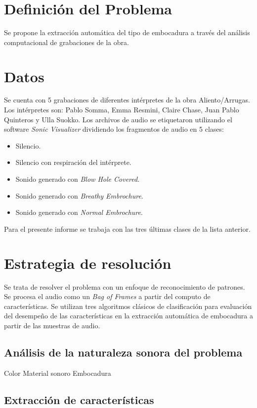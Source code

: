 \documentclass{article}
\begin{document}
\section*{Definición del Problema}
Se propone la extracción automática del tipo de embocadura a través del análisis computacional de grabaciones de la obra. 

\section*{Datos}
Se cuenta con 5 grabaciones de diferentes intérpretes de la obra Aliento/Arrugas. Los intérpretes son: Pablo Somma, Emma Resmini, Claire Chase, Juan Pablo Quinteros y Ulla Suokko. Los archivos de audio se etiquetaron utilizando el software \textit{Sonic Visualizer} dividiendo los fragmentos de audio en 5 clases:

\begin{itemize} 
  \item Silencio.
  \item Silencio con respiración del intérprete. 
  \item Sonido generado con \textit{Blow Hole Covered}.
  \item Sonido generado con \textit{Breathy Embrochure}.
  \item Sonido generado con \textit{Normal Embrochure}.
\end{itemize}

Para el presente informe se trabaja con las tres últimas clases de la lista anterior. 

\section{Estrategia de resolución}

Se trata de resolver el problema con un enfoque de reconocimiento de patrones. Se procesa el audio como un \textit{Bag of Frames} a partir del computo de características. Se utilizan tres algoritmos clásicos de clasificación para evaluación del desempeño de las características en la extracción automática de embocadura a partir de las muestras de audio.

\subsection{Análisis de la naturaleza sonora del problema}

Color
Material sonoro
Embocadura

   
\subsection{Extracción de características}
\end{document}
